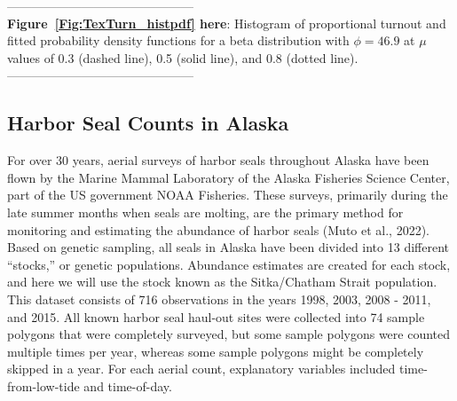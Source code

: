 \documentclass[12pt, titlepage]{article}
\begin{document}
\begin{spacing}{0.8}
\vspace{.4cm}
\noindent --------------------------------------------- \\
\textbf{Figure~\ref{Fig:TexTurn_histpdf} here}: Histogram of proportional turnout and fitted probability density functions for a beta distribution with $\phi = 46.9$ at $\mu$ values of 0.3 (dashed line), 0.5 (solid line), and 0.8 (dotted line). \\
--------------------------------------------- \\ 
\end{spacing}



\subsection{Harbor Seal Counts in Alaska}

For over 30 years, aerial surveys of harbor seals throughout Alaska have been flown by the Marine Mammal Laboratory of the Alaska Fisheries Science Center, part of the US government NOAA Fisheries. These surveys, primarily during the late summer months when seals are molting, are the primary method for monitoring and estimating the abundance of harbor seals (Muto et al., 2022). Based on genetic sampling, all seals in Alaska have been divided into 13 different ``stocks,'' or genetic populations.  Abundance estimates are created for each stock, and here we will use the stock known as the Sitka/Chatham Strait population. This dataset consists of 716 observations in the years 1998, 2003, 2008 - 2011, and 2015. All known harbor seal haul-out sites were collected into 74 sample polygons that were completely surveyed, but some sample polygons were counted multiple times per year, whereas some sample polygons might be completely skipped in a year. For each aerial count, explanatory variables included time-from-low-tide and time-of-day.
\end{document}
